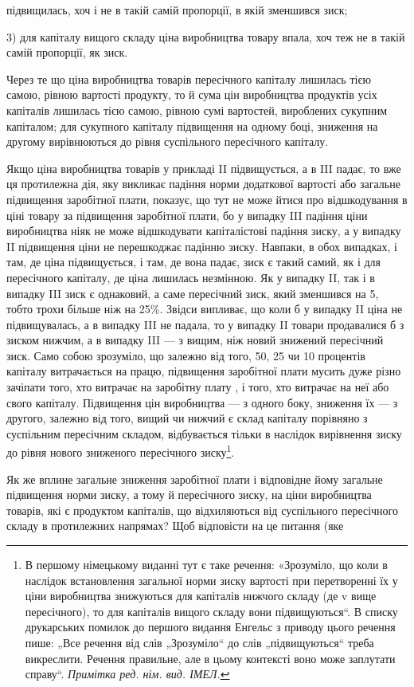 \parcont{}  %
підвищилась, хоч і не в такій самій пропорції, в якій зменшився
зиск;

3) для капіталу вищого складу ціна виробництва товару впала,
хоч теж не в такій самій пропорції, як зиск.

Через те що ціна виробництва товарів пересічного капіталу
лишилась тією самою, рівною вартості продукту, то й сума цін
виробництва продуктів усіх капіталів лишилась тією самою,
рівною сумі вартостей, вироблених сукупним капіталом; для
сукупного капіталу підвищення на одному боці, зниження на
другому вирівнюються до рівня суспільного пересічного капіталу.

Якщо ціна виробництва товарів у прикладі II підвищується,
а в III падає, то вже ця протилежна дія, яку викликає падіння
норми додаткової вартості або загальне підвищення заробітної
плати, показує, що тут не може йтися про відшкодування в
ціні товару за підвищення заробітної плати, бо у випадку III падіння
ціни виробництва ніяк не може відшкодувати капіталістові
падіння зиску, а у випадку II підвищення ціни не перешкоджає
падінню зиску. Навпаки, в обох випадках, і там, де ціна підвищується,
і там, де вона падає, зиск є такий самий, як і для
пересічного капіталу, де ціна лишилась незмінною. Як у випадку
II, так і в випадку III зиск є однаковий, а саме пересічний
зиск, який зменшився на 5, тобто трохи більше ніж на 25\%.
Звідси випливає, що коли б у випадку II ціна не підвищувалась,
а в випадку III не падала, то у випадку II товари продавалися б
з зиском нижчим, а в випадку III — з вищим, ніж новий знижений
пересічний зиск. Само собою зрозуміло, що залежно від
того, 50, 25 чи 10 процентів капіталу витрачається на працю,
підвищення заробітної плати мусить дуже різно зачіпати
того, хто витрачає на заробітну плату , і того, хто витрачає
на неї  або  свого капіталу. Підвищення цін виробництва
— з одного боку, зниження їх — з другого, залежно від
того, вищий чи нижчий є склад капіталу порівняно з суспільним
пересічним складом, відбувається тільки в наслідок вирівнення
зиску до рівня нового зниженого пересічного зиску\footnote*{
В першому німецькому виданні тут є таке речення: «Зрозуміло, що коли
в наслідок встановлення загальної норми зиску вартості при перетворенні їх
у ціни виробництва знижуються для капіталів нижчого складу (де v вище пересічного),
то для капіталів вищого складу вони підвищуються“. В списку друкарських
помилок до першого видання Енгельс з приводу цього речення
пише: „Все речення від слів „Зрозуміло“ до слів „підвищуються“ треба викреслити.
Речення правильне, але в цьому контексті воно може заплутати
справу“. \emph{Примітка ред. нім. вид. ІМЕЛ.}
}.

Як же вплине загальне зниження заробітної плати і відповідне
йому загальне підвищення норми зиску, а тому й пересічного
зиску, на ціни виробництва товарів, які є продуктом
капіталів, що відхиляються від суспільного пересічного складу
в протилежних напрямах? Щоб відповісти на це питання (яке
\parbreak{}  %
